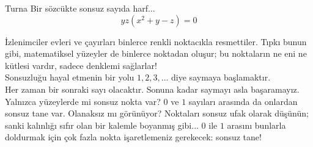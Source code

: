 \begin{surferPage}{Turna}
Bir sözcükte sonsuz sayıda harf...\\
\smallskip
\[y z (x^2	+ y - z)	= 0\]

\vspace{0.3cm}
İzlenimciler evleri ve çayırları binlerce renkli noktacıkla resmettiler. Tıpkı bunun gibi, matematiksel yüzeyler de binlerce noktadan oluşur; bu noktaların ne eni ne kütlesi vardır, sadece denklemi sağlarlar! \\
\vspace{0.3cm}
Sonsuzluğu hayal etmenin bir yolu $1, 2, 3, \dots$ diye saymaya başlamaktır.\\
Her zaman bir sonraki sayı olacaktır. Sonuna kadar saymayı asla başaramayız.\\
\vspace{0.3cm}
Yalnızca yüzeylerde mi sonsuz nokta var? $0$ ve $1$ sayıları arasında da onlardan sonsuz tane var. Olanaksız mı görünüyor? Noktaları sonsuz ufak olarak düşünün; sanki kalınlığı sıfır olan bir kalemle boyanmış gibi... $0$ ile $1$ arasını bunlarla doldurmak için çok fazla nokta işaretlemeniz gerekecek: sonsuz tane!
\end{surferPage}
